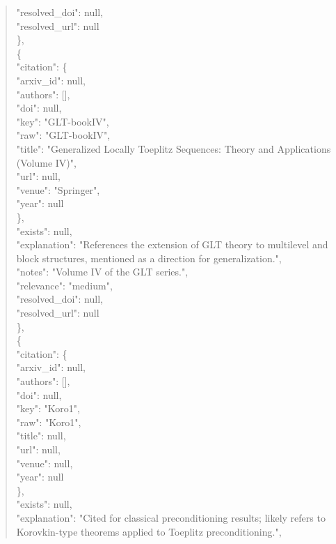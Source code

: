 \documentclass[11pt]{article}
\begin{document}
\begin{quote}
      "resolved\_doi": null,\\
      "resolved\_url": null\\
    \},\\
    \{\\
      "citation": \{\\
        "arxiv\_id": null,\\
        "authors": [],\\
        "doi": null,\\
        "key": "GLT-bookIV",\\
        "raw": "GLT-bookIV",\\
        "title": "Generalized Locally Toeplitz Sequences: Theory and Applications (Volume IV)",\\
        "url": null,\\
        "venue": "Springer",\\
        "year": null\\
      \},\\
      "exists": null,\\
      "explanation": "References the extension of GLT theory to multilevel and block structures, mentioned as a direction for generalization.",\\
      "notes": "Volume IV of the GLT series.",\\
      "relevance": "medium",\\
      "resolved\_doi": null,\\
      "resolved\_url": null\\
    \},\\
    \{\\
      "citation": \{\\
        "arxiv\_id": null,\\
        "authors": [],\\
        "doi": null,\\
        "key": "Koro1",\\
        "raw": "Koro1",\\
        "title": null,\\
        "url": null,\\
        "venue": null,\\
        "year": null\\
      \},\\
      "exists": null,\\
      "explanation": "Cited for classical preconditioning results; likely refers to Korovkin-type theorems applied to Toeplitz preconditioning.",\\

\end{quote}
\end{document}
